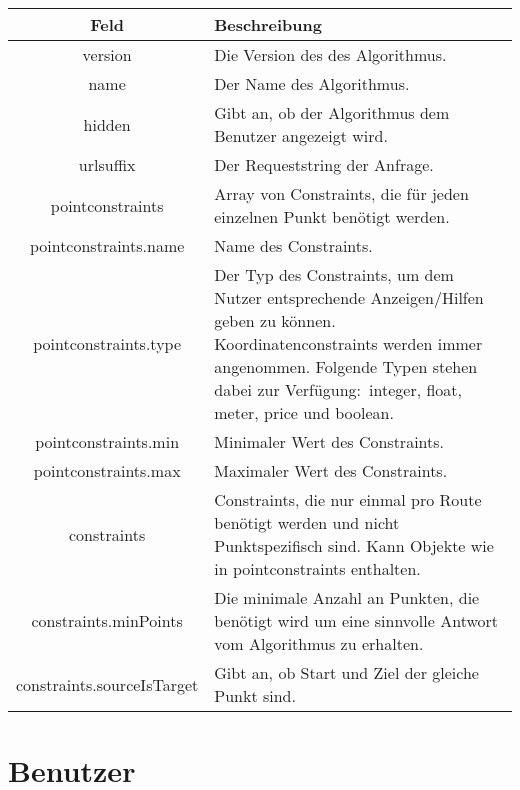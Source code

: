 \documentclass[ngerman,titlepage,parskip=true]{scrartcl}
\begin{document}
    \noindent \begin{tabular}{|c|p{11.5cm}|}
    	\hline
    	\textbf{Feld} & \textbf{Beschreibung} \\ 
    	\hline \hline
    	
    	version & Die Version des des Algorithmus. \\ 
    	\hline
    	
    	name & Der Name des Algorithmus. \\
    	\hline
    	
    	hidden & Gibt an, ob der Algorithmus dem Benutzer angezeigt wird. \\
    	\hline
    	
    	urlsuffix & Der Requeststring der Anfrage. \\
    	\hline
    	
    	pointconstraints & Array von Constraints, die für jeden einzelnen Punkt benötigt werden. \\
    	\hline
    	
    	pointconstraints.name & Name des Constraints. \\
    	\hline
    	
    	pointconstraints.type & Der Typ des Constraints, um dem Nutzer entsprechende Anzeigen/Hilfen geben zu können. Koordinatenconstraints werden immer angenommen. Folgende Typen stehen dabei zur Verfügung:\ integer, float, meter, price und boolean.\\ 
    	\hline
    	
    	pointconstraints.min & Minimaler Wert des Constraints. \\
    	\hline
    	
    	pointconstraints.max & Maximaler Wert des Constraints. \\
    	\hline
    	
    	constraints & Constraints, die nur einmal pro Route benötigt werden und nicht Punktspezifisch sind. Kann Objekte wie in pointconstraints enthalten. \\
    	\hline
    	
    	constraints.minPoints & Die minimale Anzahl an Punkten, die benötigt wird um eine sinnvolle Antwort vom Algorithmus zu erhalten.\\ 
		\hline
		
		constraints.sourceIsTarget & Gibt an, ob Start und Ziel der gleiche Punkt sind.\\    		\hline    		
   	\end{tabular}
   	\clearpage
\section{Benutzer}
\end{document}
